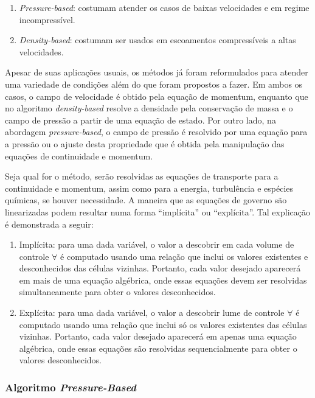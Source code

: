 \begin{enumerate}
    \item \textit{Pressure-based}: costumam atender os casos de baixas velocidades e em regime incompressível.
    \item \textit{Density-based}: costumam ser usados em escoamentos compressíveis a altas velocidades.
\end{enumerate}

Apesar de suas aplicações usuais, os métodos já foram reformulados para atender uma variedade de condições além do que foram propostos a fazer. Em ambos os casos, o campo de velocidade é obtido pela equação de momentum, enquanto que no algoritmo \textit{density-based} resolve a densidade pela conservação de massa e o campo de pressão a partir de uma equação de estado. Por outro lado, na abordagem \textit{pressure-based}, o campo de pressão é resolvido por uma equação para a pressão ou o ajuste desta propriedade que é obtida pela manipulação das equações de continuidade e momentum.

Seja qual for o método, serão resolvidas as equações de transporte para a continuidade e momentum, assim como para a energia, turbulência e espécies químicas, se houver necessidade. A maneira que as equações de governo são linearizadas podem resultar numa forma “implícita” ou “explícita”. Tal explicação é demonstrada a seguir:

\begin{enumerate}
    \item Implícita: para uma dada variável, o valor a descobrir em cada volume de controle $\forall$ é computado usando uma relação que inclui os valores existentes e desconhecidos das células vizinhas. Portanto, cada valor desejado aparecerá em mais de uma equação algébrica, onde essas equações devem ser resolvidas simultaneamente para obter o valores desconhecidos.
    \item Explícita: para uma dada variável, o valor a descobrir lume de controle $\forall$ é computado usando uma relação que inclui só os valores existentes das células vizinhas. Portanto, cada valor desejado aparecerá em apenas uma equação algébrica, onde essas equações são resolvidas sequencialmente para obter o valores desconhecidos. 
\end{enumerate}

\subsubsection{Algoritmo \textit{Pressure-Based}}

